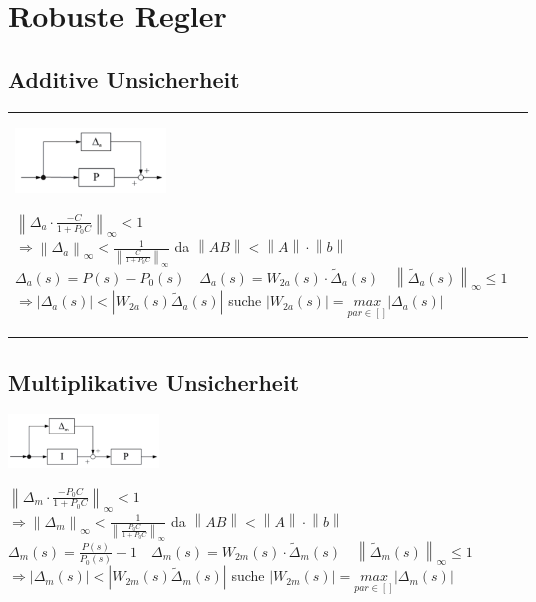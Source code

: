 \section{Robuste Regler}


\subsection{Additive Unsicherheit}

\begin{tabular}{ll}
	\parbox{5cm}{
	\includegraphics[width=4cm]{./bilder/rob_add.png}}
	\parbox{15cm}{
		$ \left \lVert \Delta_a \cdot \frac{-C}{1+P_0 C} \right\rVert_\infty < 1 $\\
		$ \Rightarrow \left \lVert \Delta_a \right\rVert_\infty < \frac{1}{\left \lVert \frac{C}{1+P_0 C} \right\rVert_\infty}$ da $\left \lVert AB \right\rVert < \left \lVert A \right\rVert \cdot \left \lVert b \right\rVert$\\
		$\Delta_a(s)=P(s) - P_0(s) \quad \Delta_a(s)=W_{2a}(s) \cdot \tilde{\Delta}_a(s) \quad \left \lVert \tilde{\Delta}_a(s) \right\rVert_\infty \leq 1$\\
		$ \Rightarrow \left| \Delta_a(s) \right| < \left| W_{2a}(s) \tilde{\Delta}_a(s) \right| $ suche $\left| W_{2a}(s) \right|  = \underset{par\in[]}{max} \left| \Delta_a(s) \right| $
		}
\end{tabular}		

\subsection{Multiplikative Unsicherheit}
	\parbox{5cm}{
	\includegraphics[width=4cm]{./bilder/rob_mult.png}}
	\parbox{15cm}{
		$ \left \lVert \Delta_m \cdot \frac{-P_0C}{1+P_0 C} \right\rVert_\infty < 1 $\\
		$ \Rightarrow \left \lVert \Delta_m \right\rVert_\infty < \frac{1}{\left \lVert \frac{P_0C}{1+P_0 C} \right\rVert_\infty}$ da $\left \lVert AB \right\rVert < \left \lVert A \right\rVert \cdot \left \lVert b \right\rVert$\\
		$\Delta_m(s)=\frac{P(s)}{P_0(s)} - 1 \quad \Delta_m(s)=W_{2m}(s) \cdot \tilde{\Delta}_m(s) \quad \left \lVert \tilde{\Delta}_m(s) \right\rVert_\infty \leq 1$\\
		$\Rightarrow \left| \Delta_m(s) \right| < \left| W_{2m}(s) \tilde{\Delta}_m(s) \right| $ suche $\left| W_{2m}(s) \right|  = \underset{par\in[]}{max} \left| \Delta_m(s) \right| $
		}
		
